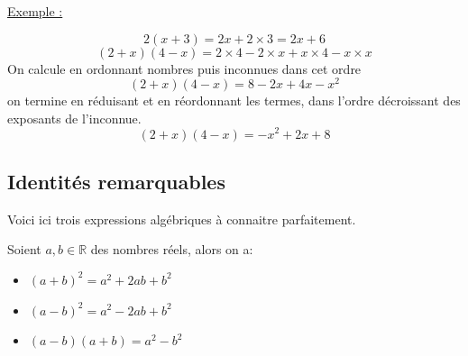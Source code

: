 \documentclass[french]{book}
\begin{document}
\underline{Exemple :}

$$2(x+3)=2x+2\times3=2x+6$$
$$(2+x)(4-x)=2\times4-2\times x + x \times 4 - x \times x$$
On calcule en ordonnant nombres puis inconnues dans cet ordre
$$(2+x)(4-x)=8-2x+4x-x^2$$
on termine en réduisant et en réordonnant les termes, dans l'ordre décroissant des exposants de l'inconnue.
$$(2+x)(4-x)=-x^2+2x+8$$

\subsection{Identités remarquables}

Voici ici trois expressions algébriques à connaitre parfaitement.

\begin{prop}
Soient $a,b \in \mathbb{R}$ des nombres réels, alors on a: 
\begin{itemize}
\item[$\bullet$] $(a+b)^2=a^2+2ab+b^2$
\item[$\bullet$] $(a-b)^2=a^2-2ab+b^2$
\item[$\bullet$] $(a-b)(a+b)=a^2-b^2$
\end{itemize}
\end{prop}
\end{document}
